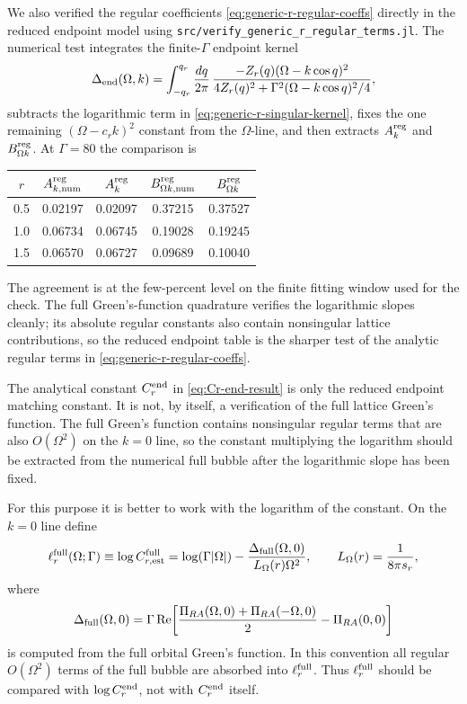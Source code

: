 \documentclass[aps,prx,preprint,amsmath,amssymb]{revtex4-2}
\renewcommand{\Re}{\text{Re}}
\begin{document}
We also verified the regular coefficients
\eqref{eq:generic-r-regular-coeffs} directly in the reduced endpoint model using
\texttt{src/verify\_generic\_r\_regular\_terms.jl}.  The numerical test
integrates the finite-\(\Gamma\) endpoint kernel
\[
\Delta_{\rm end}(\Omega,k)
=
\int_{-q_r}^{q_r}\frac{dq}{2\pi}\,
\frac{-Z_r(q)(\Omega-k\cos q)^2}
{4Z_r(q)^2+\Gamma^2(\Omega-k\cos q)^2/4},
\]
subtracts the logarithmic term in \eqref{eq:generic-r-singular-kernel}, fixes
the one remaining \((\Omega-c_r k)^2\) constant from the \(\Omega\)-line, and
then extracts \(A_k^{\rm reg}\) and \(B_{\Omega k}^{\rm reg}\).  At
\(\Gamma=80\) the comparison is
\begin{center}
\begin{tabular}{ccccc}
\toprule
\(r\) &
\(A_{k,\rm num}^{\rm reg}\) &
\(A_k^{\rm reg}\) &
\(B_{\Omega k,\rm num}^{\rm reg}\) &
\(B_{\Omega k}^{\rm reg}\) \\
\midrule
0.5 & 0.02197 & 0.02097 & 0.37215 & 0.37527 \\
1.0 & 0.06734 & 0.06745 & 0.19028 & 0.19245 \\
1.5 & 0.06570 & 0.06727 & 0.09689 & 0.10040 \\
\bottomrule
\end{tabular}
\end{center}
The agreement is at the few-percent level on the finite fitting window used for
the check.  The full Green's-function quadrature verifies the logarithmic slopes
cleanly; its absolute regular constants also contain nonsingular lattice
contributions, so the reduced endpoint table is the sharper test of the
analytic regular terms in \eqref{eq:generic-r-regular-coeffs}.

The analytical constant \(C_r^{\rm end}\) in \eqref{eq:Cr-end-result} is only
the reduced endpoint matching constant.  It is not, by itself, a verification of
the full lattice Green's function.  The full Green's function contains
nonsingular regular terms that are also \(O(\Omega^2)\) on the \(k=0\) line, so
the constant multiplying the logarithm should be extracted from the numerical
full bubble after the logarithmic slope has been fixed.

For this purpose it is better to work with the logarithm of the constant.  On
the \(k=0\) line define
\begin{equation}
\label{eq:lnCr-full-estimator}
\ell_r^{\rm full}(\Omega;\Gamma)
\equiv
\log C_{r,\rm est}^{\rm full}
=
\log(\Gamma|\Omega|)
-
\frac{
\Delta_{\rm full}(\Omega,0)}
{L_\Omega(r)\Omega^2},
\qquad
L_\Omega(r)=\frac{1}{8\pi s_r},
\end{equation}
where
\[
\Delta_{\rm full}(\Omega,0)
=
\Gamma\,\Re\!\left[
\frac{\Pi_{RA}(\Omega,0)+\Pi_{RA}(-\Omega,0)}{2}
-\Pi_{RA}(0,0)\right]
\]
is computed from the full orbital Green's function.  In this convention all
regular \(O(\Omega^2)\) terms of the full bubble are absorbed into
\(\ell_r^{\rm full}\).  Thus \(\ell_r^{\rm full}\) should be compared with
\(\log C_r^{\rm end}\), not with \(C_r^{\rm end}\) itself.
\end{document}
